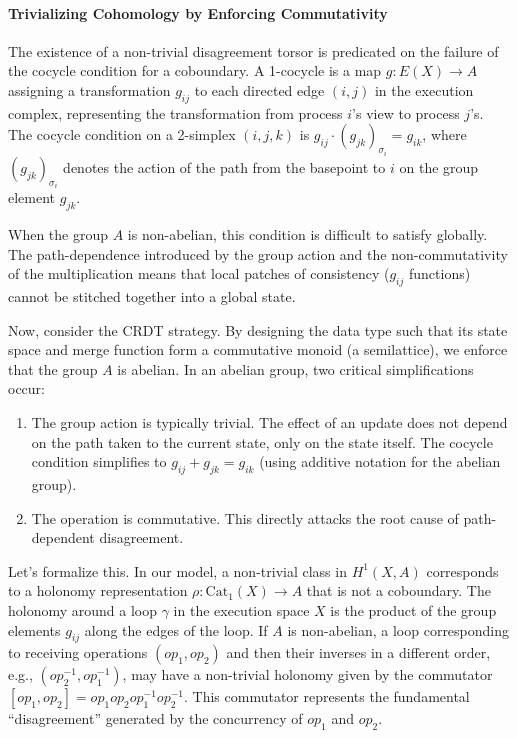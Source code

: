 \documentclass[
]{article}
\providecommand{\tightlist}{%
  \setlength{\itemsep}{0pt}\setlength{\parskip}{0pt}}
\begin{document}
\paragraph{Trivializing Cohomology by Enforcing
Commutativity}\label{trivializing-cohomology-by-enforcing-commutativity}

The existence of a non-trivial disagreement torsor is predicated on the
failure of the cocycle condition for a coboundary. A 1-cocycle is a map
\(g: E(X) \to A\) assigning a transformation \(g_{ij}\) to each directed
edge \((i,j)\) in the execution complex, representing the transformation
from process \(i\)'s view to process \(j\)'s. The cocycle condition on a
2-simplex \((i,j,k)\) is \(g_{ij} \cdot (g_{jk})_{\sigma_i} = g_{ik}\),
where \((g_{jk})_{\sigma_i}\) denotes the action of the path from the
basepoint to \(i\) on the group element \(g_{jk}\).

When the group \(A\) is non-abelian, this condition is difficult to
satisfy globally. The path-dependence introduced by the group action and
the non-commutativity of the multiplication means that local patches of
consistency (\(g_{ij}\) functions) cannot be stitched together into a
global state.

Now, consider the CRDT strategy. By designing the data type such that
its state space and merge function form a commutative monoid (a
semilattice), we enforce that the group \(A\) is abelian. In an abelian
group, two critical simplifications occur:

\begin{enumerate}
\def\labelenumi{\arabic{enumi}.}
\tightlist
\item
  The group action is typically trivial. The effect of an update does
  not depend on the path taken to the current state, only on the state
  itself. The cocycle condition simplifies to
  \(g_{ij} + g_{jk} = g_{ik}\) (using additive notation for the abelian
  group).
\item
  The operation is commutative. This directly attacks the root cause of
  path-dependent disagreement.
\end{enumerate}

Let's formalize this. In our model, a non-trivial class in \(H^1(X,A)\)
corresponds to a holonomy representation \(\rho: \text{Cat}_1(X) \to A\)
that is not a coboundary. The holonomy around a loop \(\gamma\) in the
execution space \(X\) is the product of the group elements \(g_{ij}\)
along the edges of the loop. If \(A\) is non-abelian, a loop
corresponding to receiving operations \((op_1, op_2)\) and then their
inverses in a different order, e.g., \((op_2^{-1}, op_1^{-1})\), may
have a non-trivial holonomy given by the commutator
\([op_1, op_2] = op_1 op_2 op_1^{-1} op_2^{-1}\). This commutator
represents the fundamental ``disagreement'' generated by the concurrency
of \(op_1\) and \(op_2\).
\end{document}
